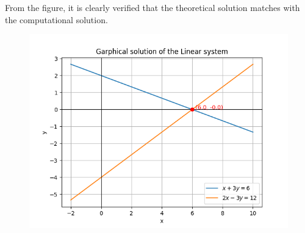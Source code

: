 \documentclass[journal]{IEEEtran}
\begin{document}
\newpage
\vspace*{0.25cm}

From the figure, it is clearly verified that the theoretical solution matches with the computational solution.\\

 \begin{figure}[H]
     \centering
     \includegraphics[width=0.8\columnwidth]{figs/Figure_1.png}
     \label{fig:1}
 \end{figure}
\end{document}
